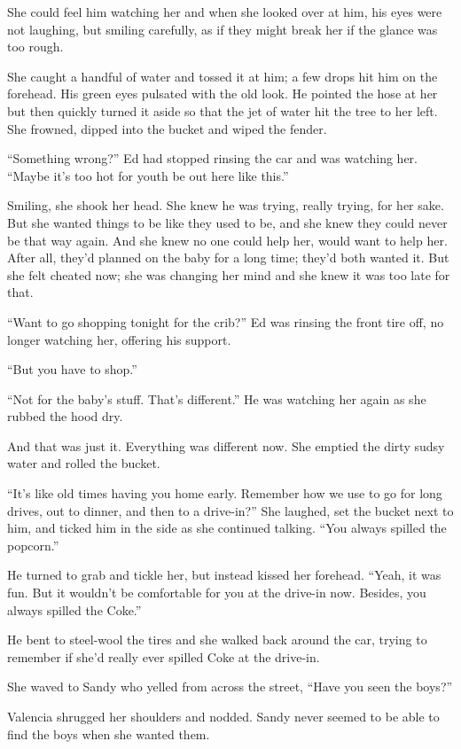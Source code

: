 \documentclass[
]{article}
\begin{document}
She could feel him watching her and when she looked over at him, his
eyes were not laughing, but smiling carefully, as if they might break
her if the glance was too rough.

She caught a handful of water and tossed it at him; a few drops hit him
on the forehead. His green eyes pulsated with the old look. He pointed
the hose at her but then quickly turned it aside so that the jet of
water hit the tree to her left. She frowned, dipped into the bucket and
wiped the fender.

``Something wrong?'' Ed had stopped rinsing the car and was watching
her. ``Maybe it's too hot for youth be out here like this.''

Smiling, she shook her head. She knew he was trying, really trying, for
her sake. But she wanted things to be like they used to be, and she knew
they could never be that way again. And she knew no one could help her,
would want to help her. After all, they'd planned on the baby for a long
time; they'd both wanted it. But she felt cheated now; she was changing
her mind and she knew it was too late for that.

``Want to go shopping tonight for the crib?'' Ed was rinsing the front
tire off, no longer watch­ing her, offering his support.

``But you have to shop.''

``Not for the baby's stuff. That's different.'' He was watching her
again as she rubbed the hood dry.

And that was just it. Everything was different now. She emptied the
dirty sudsy water and rolled the bucket.

``It's like old times having you home early. Remember how we use to go
for long drives, out to dinner, and then to a drive-in?'' She laughed,
set the bucket next to him, and ticked him in the side as she continued
talking. ``You always spilled the popcorn.''

He turned to grab and tickle her, but instead kissed her forehead.
``Yeah, it was fun. But it wouldn't be comfortable for you at the
drive-in now. Besides, you always spilled the Coke.''

He bent to steel-wool the tires and she walked back around the car,
trying to remember if she'd really ever spilled Coke at the drive-in.

She waved to Sandy who yelled from across the street, ``Have you seen
the boys?''

Valencia shrugged her shoulders and nodded. Sandy never seemed to be
able to find the boys when she wanted them.
\end{document}
